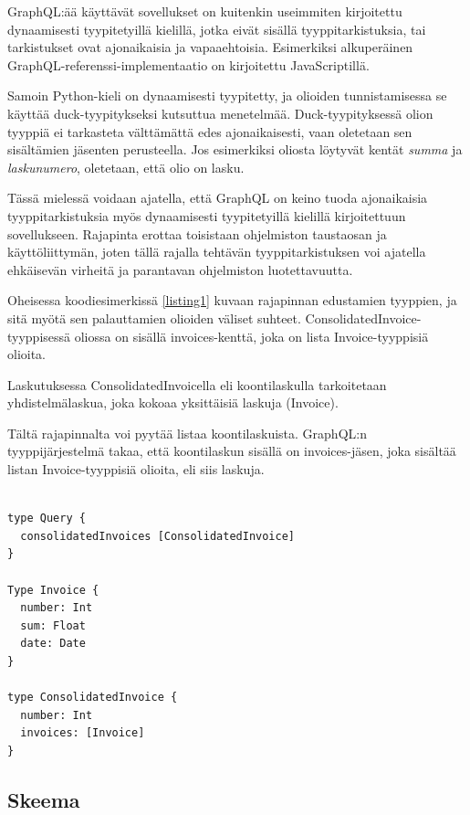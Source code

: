 GraphQL:ää käyttävät sovellukset on kuitenkin useimmiten kirjoitettu
dynaamisesti tyypitetyillä kielillä, jotka eivät sisällä
tyyppitarkistuksia, tai tarkistukset ovat ajonaikaisia ja vapaaehtoisia.
Esimerkiksi alkuperäinen GraphQL-referenssi-implementaatio on
kirjoitettu JavaScriptillä.\cite{graphqlRefImple2021Oct}

Samoin Python-kieli on dynaamisesti tyypitetty, ja olioiden
tunnistamisessa se käyttää duck-tyypitykseksi kutsuttua menetelmää.
Duck-tyypityksessä olion tyyppiä ei tarkasteta välttämättä edes
ajonaikaisesti, vaan oletetaan sen sisältämien jäsenten
perusteella.\cite{pythonGloss2021Oct} Jos esimerkiksi oliosta löytyvät
kentät \emph{summa} ja \emph{laskunumero}, oletetaan, että olio on
lasku.

Tässä mielessä voidaan ajatella, että GraphQL on keino tuoda
ajonaikaisia tyyppitarkistuksia myös dynaamisesti tyypitetyillä kielillä
kirjoitettuun sovellukseen. Rajapinta erottaa toisistaan ohjelmiston
taustaosan ja käyttöliittymän, joten tällä rajalla tehtävän
tyyppitarkistuksen voi ajatella ehkäisevän virheitä ja parantavan
ohjelmiston luotettavuutta.

Oheisessa koodiesimerkissä \ref{listing1} kuvaan rajapinnan edustamien
tyyppien, ja sitä myötä sen palauttamien olioiden väliset suhteet.
ConsolidatedInvoice-tyyppisessä oliossa on sisällä invoices-kenttä, joka
on lista Invoice-tyyppisiä olioita.

Laskutuksessa ConsolidatedInvoicella eli koontilaskulla tarkoitetaan
yhdistelmälaskua, joka kokoaa yksittäisiä laskuja (Invoice).

Tältä rajapinnalta voi pyytää listaa koontilaskuista. GraphQL:n
tyyppijärjestelmä takaa, että koontilaskun sisällä on invoices-jäsen,
joka sisältää listan Invoice-tyyppisiä olioita, eli siis laskuja.

\begin{code}
  \begin{verbatim}

type Query {
  consolidatedInvoices [ConsolidatedInvoice]
}

Type Invoice {
  number: Int
  sum: Float
  date: Date
}

type ConsolidatedInvoice {
  number: Int
  invoices: [Invoice]
}
  \end{verbatim}
  \label{listing1}
\end{code}

\hypertarget{skeema}{%
\subsection{Skeema}\label{skeema}}

